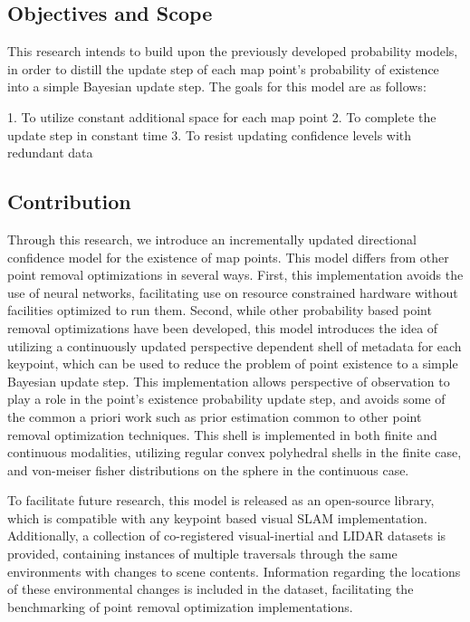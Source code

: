 \documentclass[12pt]{article}
\begin{document}
\subsection{Objectives and Scope}

This research intends to build upon the previously developed probability models, in order to distill the update step of each map point's probability of existence into a simple Bayesian update step. The goals for this model are as follows:

1. To utilize constant additional space for each map point
2. To complete the update step in constant time
3. To resist updating confidence levels with redundant data

\subsection{Contribution}

Through this research, we introduce an incrementally updated directional confidence model for the existence of map points. This model differs from other point removal optimizations in several ways. First, this implementation avoids the use of neural networks, facilitating use on resource constrained hardware without facilities optimized to run them. Second, while other probability based point removal optimizations have been developed, this model introduces the idea of utilizing a continuously updated perspective dependent shell of metadata for each keypoint, which can be used to reduce the problem of point existence to a simple Bayesian update step. This implementation allows perspective of observation to play a role in the point's existence probability update step, and avoids some of the common a priori work such as prior estimation common to other point removal optimization techniques. This shell is implemented in both finite and continuous modalities, utilizing regular convex polyhedral shells in the finite case, and von-meiser fisher distributions on the sphere in the continuous case.

To facilitate future research, this model is released as an open-source library, which is compatible with any keypoint based visual SLAM implementation. Additionally, a collection of co-registered visual-inertial and LIDAR datasets is provided, containing instances of multiple traversals through the same environments with changes to scene contents. Information regarding the locations of these environmental changes is included in the dataset, facilitating the benchmarking of point removal optimization implementations.
\end{document}
